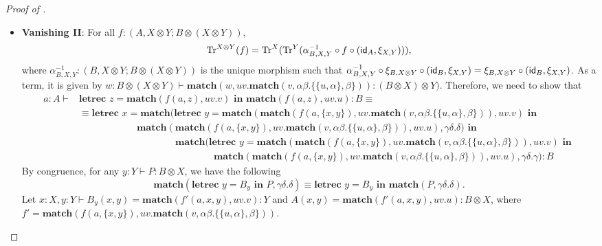 \begin{proof}[Proof of ]
\begin{itemize}
\begin{align*}
  &\text{by $\beta$}\\
  &\textbf{letrec } x = x \textbf{ in } f(a) : B\\
  &\text{by \autoref{eq:let_equations:gc}}\\
  &\equiv f(a): B
\end{align*}
\item \textbf{Vanishing II}: For all $f : (A, X \otimes Y; B \otimes (X \otimes Y))$,
\[
\text{Tr}^{X \otimes Y}(f) = \text{Tr}^{X}(\text{Tr}^{Y}(\alpha_{B,X,Y}^{-1} \circ f \circ (\textsf{id}_{A}, \xi_{X,Y}))),
\]
where $\alpha_{B,X,Y}^{-1} : (B, X \otimes Y; B \otimes (X \otimes Y))$ is the unique morphism such that $\alpha_{B,X,Y}^{-1} \circ \xi_{B, X \otimes Y} \circ (\textsf{id}_{B}, \xi_{X,Y}) = \xi_{B, X \otimes Y} \circ (\textsf{id}_{B}, \xi_{X,Y})$.
As a term, it is given by $w : B \otimes (X \otimes Y) \vdash \textbf{match}(w, uv. \textbf{match}(v, \alpha\beta.\{\{u, \alpha\},\beta\})) : (B \otimes X) \otimes Y)$.
Therefore, we need to show that
\begin{align*}
a : A \vdash &\textbf{letrec } z = \textbf{match}(f(a,z), uv.v) \textbf{ in } \textbf{match}(f(a,z), uv.u) : B \equiv\\
&\equiv \textbf{letrec } x = \textbf{match}(\textbf{letrec } y = \textbf{match}(\textbf{match}(f(a,\{x,y\}), uv.\textbf{match}(v, \alpha\beta.\{\{u,\alpha\}, \beta\})), uv.v) \textbf{ in }\\
&\hspace{6em}\textbf{match}(\textbf{match}(f(a,\{x,y\}), uv.\textbf{match}(v, \alpha\beta.\{\{u,\alpha\}, \beta\})), uv.u), \gamma\delta.\delta) \textbf{ in }\\
&\hspace{10em}\textbf{match}(\textbf{letrec } y = \textbf{match}(\textbf{match}(f(a,\{x,y\}), uv.\textbf{match}(v, \alpha\beta.\{\{u,\alpha\}, \beta\})), uv.v) \textbf{ in }\\
&\hspace{14em}\textbf{match}(\textbf{match}(f(a,\{x,y\}), uv.\textbf{match}(v, \alpha\beta.\{\{u,\alpha\}, \beta\})), uv.u), \gamma\delta.\gamma) : B
\end{align*}
By congruence, for any $y : Y \vdash P : B \otimes X$, we have the following
\[
\textbf{match}(\textbf{letrec } y = B_{y} \textbf{ in } P, \gamma\delta.\delta) \equiv \textbf{letrec } y = B_{y} \textbf{ in } \textbf{match}(P, \gamma\delta.\delta).
\]
Let $x : X, y : Y \vdash B_y(x,y) = \textbf{match}(f'(a,x,y), uv.v) : Y$ and $A(x,y) = \textbf{match}(f'(a,x,y), uv.u) : B \otimes X$,
where $f' = \textbf{match}(f(a,\{x,y\}), uv.\textbf{match}(v,\alpha\beta.\{\{u,\alpha\}, \beta\}))$.

\end{itemize}
\end{proof}

